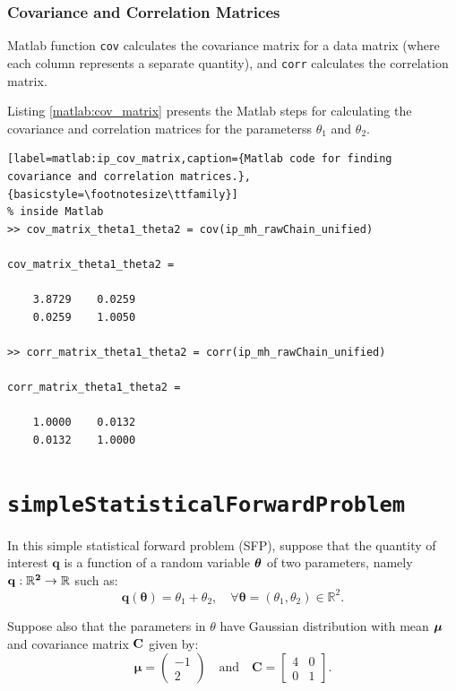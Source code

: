 \subsubsection{Covariance and Correlation Matrices}

Matlab function \verb+cov+ calculates the covariance matrix for a data matrix (where each column represents a separate quantity), 
and \verb+corr+ calculates the correlation matrix.

Listing \ref{matlab:cov_matrix} presents the Matlab steps for calculating the covariance and correlation matrices for the parameterss $\theta_1$ and $\theta_2$.
\begin{lstlisting}[label=matlab:ip_cov_matrix,caption={Matlab code for finding covariance and correlation matrices.},{basicstyle=\footnotesize\ttfamily}]
% inside Matlab
>> cov_matrix_theta1_theta2 = cov(ip_mh_rawChain_unified)

cov_matrix_theta1_theta2 =

    3.8729    0.0259
    0.0259    1.0050
    
>> corr_matrix_theta1_theta2 = corr(ip_mh_rawChain_unified)

corr_matrix_theta1_theta2 =

    1.0000    0.0132
    0.0132    1.0000    
\end{lstlisting}

\section{\texttt{simpleStatisticalForwardProblem}}

In this simple statistical forward problem (SFP), suppose that the quantity of interest $\mathbf{q}$ is a function of a random variable $\mbox{\boldmath$ \theta $}$ of two parameters, namely $\bf{q}:\mathbb{R}^2\rightarrow\mathbb{R}$ such as:
\begin{equation}\label{eq-example-q}
\mathbf{q}(\boldsymbol{\theta}) = \theta_1+\theta_2,\quad\forall\boldsymbol{\theta}=(\theta_1,\theta_2)\in\mathbb{R}^2.
\end{equation}

Suppose also that the parameters in $\theta$ have Gaussian distribution with mean $\mbox{\boldmath$ \mu $}$ and covariance matrix $\bf{C}$ given by:
\begin{equation}\label{eq-example-mu-sfp}
\boldsymbol{\mu} = 
\left(\begin{array}{c}
-1 \\
2
\end{array}\right)
\quad
\text{and}
\quad
\mathbf{C} = 
\left[\begin{array}{cc}
4 & 0 \\
0 & 1
\end{array}\right].
\end{equation}


